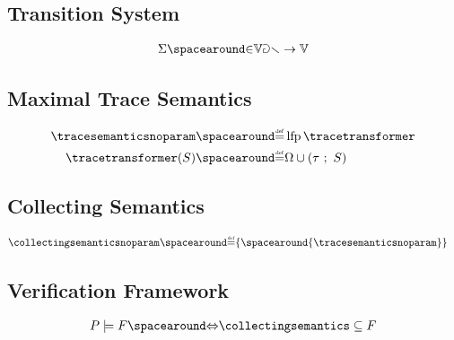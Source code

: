 \subsection{Transition System}

\begin{definition}[State]
  \begin{align*}
    \state \IN \variables \to \values
  \end{align*}
\end{definition}

\subsection{Maximal Trace Semantics}

\begin{definition}
  \begin{align*}
    \tracesemanticsnoparam &\DefeQ \lfp \tracetransformer \\
    \tracetransformer(\defsetoftraces) &\DefeQ \finalstates \setjoin (\mergesequences{\transitionrelation}{\defsetoftraces})
  \end{align*}
\end{definition}

\subsection{Collecting Semantics}

\begin{definition}
  \begin{align*}
    \collectingsemanticsnoparam &\DefeQ \{\spacearound{\tracesemanticsnoparam}\}
  \end{align*}

\end{definition}

\subsection{Verification Framework}

\begin{definition}[Validation]
  \begin{align*}
    \defprogram \satisfies \defproperty \IfF \collectingsemantics \subseteq \defproperty
  \end{align*}
\end{definition}

